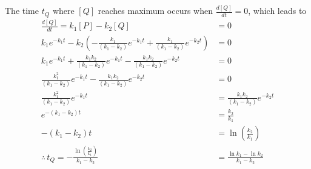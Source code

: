 \begin{solution}
The time $t_Q$ where $[Q]$ reaches maximum occurs when $\frac{d[Q]}{dt} = 0$, which leads to
\begin{align*}
\frac{d[Q]}{dt} = k_1[P] - k_2[Q] &= 0 \\
k_1e^{-k_1 t} - k_2(-\frac{k_1}{(k_1-k_2)}e^{-k_1 t} + \frac{k_1}{(k_1-k_2)}e^{-k_2t}) &= 0 \\
k_1e^{-k_1 t} + \frac{k_1k_2}{(k_1-k_2)}e^{-k_1 t} - \frac{k_1k_2}{(k_1-k_2)}e^{-k_2t} &= 0 \\
\frac{k_1^2}{(k_1-k_2)}e^{-k_1 t} - \frac{k_1k_2}{(k_1-k_2)}e^{-k_2t} &= 0 \\
\frac{k_1^2}{(k_1-k_2)}e^{-k_1 t} &= \frac{k_1k_2}{(k_1-k_2)}e^{-k_2t} \\
e^{-(k_1-k_2)t} &= \frac{k_2}{k_1} \\
-(k_1-k_2)t &= \ln\left(\frac{k_2}{k_1}\right) \\
\therefore \, t_Q = -\frac{\ln(\frac{k_2}{k_1})}{k_1 - k_2} &= \frac{\ln k_1 - \ln k_2}{k_1 - k_2}
\end{align*}
\end{solution}

